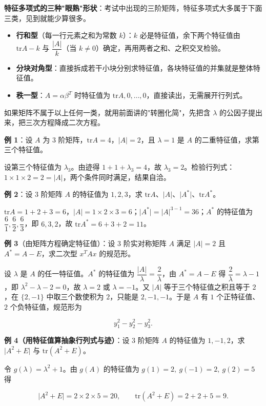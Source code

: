 \documentclass[11pt,openany,UTF8]{ctexbook}
\begin{document}
\textbf{特征多项式的三种"眼熟"形状}：考试中出现的三阶矩阵，特征多项式大多属于下面三类，见到就能少算很多。

\begin{itemize}
\item \textbf{行和型}（每一行元素之和为常数 $k$）：$k$ 必是特征值，余下两个特征值由 $\mathrm{tr}A-k$ 与 $\dfrac{\vert A\vert}{k}$（当 $k\neq0$）确定，再用两者之和、之积交叉检验。
\item \textbf{分块对角型}：直接拆成若干小块分别求特征值，各块特征值的并集就是整体特征值。
\item \textbf{秩一型}：$A=\alpha\beta^T$ 时特征值为 $\mathrm{tr}A,0,\dots,0$，直接读出，无需展开行列式。
\end{itemize}
如果矩阵不属于以上任何一类，就用前面讲的"转圈化简"，先把含 $\lambda$ 的公因子提出来，把三次方程降成二次方程。

\textbf{例 1}：设 $A$ 为 $3$ 阶矩阵，$\mathrm{tr}A=4$，$\vert A\vert=2$，且 $\lambda=1$ 是 $A$ 的二重特征值，求第三个特征值。

设第三个特征值为 $\lambda_3$。由迹得 $1+1+\lambda_3=4$，故 $\lambda_3=2$。检验行列式：$1\times1\times2=2=\vert A\vert$，两个条件同时满足，结果自洽。

\textbf{例 2}：设 $3$ 阶矩阵 $A$ 的特征值为 $1,2,3$，求 $\mathrm{tr}A$、$\vert A\vert$、$\vert A^*\vert$、$\mathrm{tr}A^*$。

$\mathrm{tr}A=1+2+3=6$，$\vert A\vert=1\times2\times3=6$；$\vert A^*\vert=\vert A\vert^{3-1}=36$；$A^*$ 的特征值为 $\dfrac{6}{1},\dfrac{6}{2},\dfrac{6}{3}$，即 $6,3,2$，故 $\mathrm{tr}A^*=6+3+2=11$。

\textbf{例 3}（由矩阵方程确定特征值）：设 $3$ 阶实对称矩阵 $A$ 满足 $\vert A\vert=2$ 且 $A^*=A-E$，求二次型 $x^TAx$ 的规范形。

设 $\lambda$ 是 $A$ 的任一特征值。$A^*$ 的特征值为 $\dfrac{\vert A\vert}{\lambda}=\dfrac{2}{\lambda}$，由 $A^*=A-E$ 得 $\dfrac{2}{\lambda}=\lambda-1$，即 $\lambda^2-\lambda-2=0$，故 $\lambda=2$ 或 $\lambda=-1$。又 $\vert A\vert$ 等于三个特征值之积且等于 $2$，在 $\{2,-1\}$ 中取三个数使积为 $2$，只能是 $2,-1,-1$。于是 $A$ 有 $1$ 个正特征值、$2$ 个负特征值，规范形为

\[y_1^2-y_2^2-y_3^2 .\]

\textbf{例 4（用特征值算抽象行列式与迹）}：设 $3$ 阶矩阵 $A$ 的特征值为 $1,-1,2$，求 $\vert A^2+E\vert$ 与 $\mathrm{tr}(A^2+E)$。

令 $g(\lambda)=\lambda^2+1$。由 $g(A)$ 的特征值为 $g(1)=2,\ g(-1)=2,\ g(2)=5$ 得

\[\vert A^2+E\vert=2\times2\times5=20,\qquad \mathrm{tr}(A^2+E)=2+2+5=9 .\]
\end{document}
